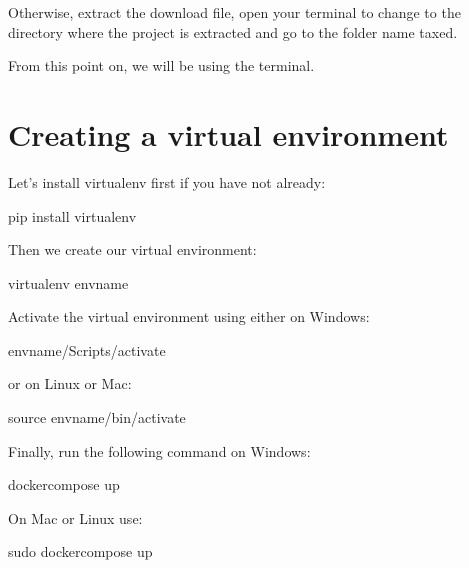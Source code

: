 \documentclass[letterpaper,10pt,english]{sphinxmanual}
\begin{document}
\sphinxAtStartPar
Otherwise, extract the download file, open your terminal to change to the directory where the project is extracted and go to the folder name taxed.

\sphinxAtStartPar
From this point on, we will be using the terminal.


\section{Creating a virtual environment}
\label{\detokenize{pages/installation-testing:creating-a-virtual-environment}}
\sphinxAtStartPar
Let’s install virtualenv first if you have not already:

\begin{sphinxVerbatim}[commandchars=\\\{\}]
\PYGZdl{} pip install virtualenv
\end{sphinxVerbatim}

\sphinxAtStartPar
Then we create our virtual environment:

\begin{sphinxVerbatim}[commandchars=\\\{\}]
\PYGZdl{} virtualenv envname
\end{sphinxVerbatim}

\sphinxAtStartPar
Activate the virtual environment using either on Windows:

\begin{sphinxVerbatim}[commandchars=\\\{\}]
\PYGZdl{} envname/Scripts/activate
\end{sphinxVerbatim}

\sphinxAtStartPar
or on Linux or Mac:

\begin{sphinxVerbatim}[commandchars=\\\{\}]
\PYGZdl{} source envname/bin/activate
\end{sphinxVerbatim}

\sphinxAtStartPar
Finally, run the following command on Windows:

\begin{sphinxVerbatim}[commandchars=\\\{\}]
\PYGZdl{} docker\PYGZhy{}compose up
\end{sphinxVerbatim}

\sphinxAtStartPar
On Mac or Linux use:

\begin{sphinxVerbatim}[commandchars=\\\{\}]
\PYGZdl{} sudo docker\PYGZhy{}compose up
\end{sphinxVerbatim}
\end{document}
